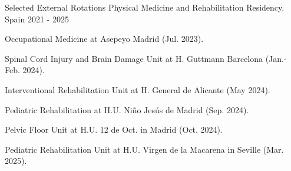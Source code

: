 \begin{cventries}
  \cventry
    {Selected External Rotations} %
    {Physical Medicine and Rehabilitation Residency.} %
    {Spain} %
    {2021 - 2025} %
    {
      \begin{cvitems} %
        \item {Occupational Medicine at Asepeyo Madrid (Jul. 2023).}
        \item {Spinal Cord Injury and Brain Damage Unit at H. Guttmann Barcelona (Jan.-Feb. 2024).}
        \item {Interventional Rehabilitation Unit at H. General de Alicante (May 2024).}
        \item {Pediatric Rehabilitation at H.U. Niño Jesús de Madrid (Sep. 2024).}
        \item {Pelvic Floor Unit at H.U. 12 de Oct. in Madrid (Oct. 2024).}
        \item {Pediatric Rehabilitation Unit at H.U. Virgen de la Macarena in Seville (Mar. 2025).}
      \end{cvitems}
    }

\end{cventries}
